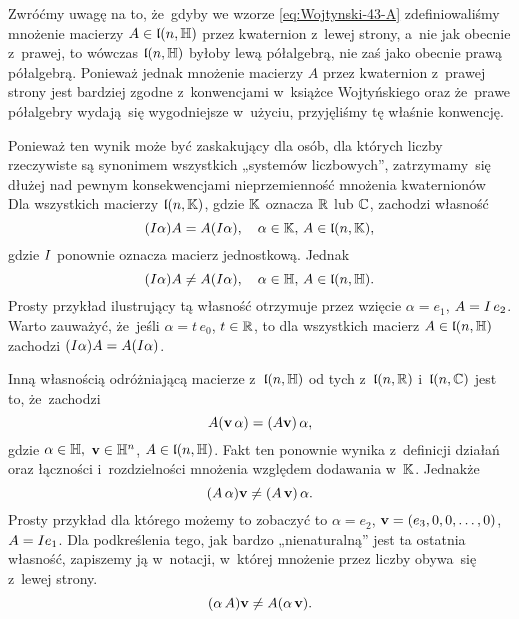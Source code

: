 \documentclass[a4paper,11pt]{article}
\begin{document}
Zwróćmy uwagę na to, że~gdyby we wzorze \eqref{eq:Wojtynski-43-A}
zdefiniowaliśmy mnożenie macierzy $A \in \mathfrak{l}( n, \mathbb{H} )$ przez kwaternion
z~lewej strony, a~nie jak obecnie z~prawej, to wówczas $\mathfrak{l}( n, \mathbb{H} )$
byłoby lewą półalgebrą, nie zaś jako obecnie prawą półalgebrą. Ponieważ
jednak mnożenie macierzy $A$ przez kwaternion z~prawej strony jest bardziej
zgodne z~konwencjami w~książce Wojtyńskiego oraz że~prawe półalgebry
wydają~się wygodniejsze w~użyciu, przyjęliśmy tę właśnie konwencję.

Ponieważ ten wynik może być zaskakujący dla osób, dla których liczby
rzeczywiste są synonimem wszystkich „systemów liczbowych”, zatrzymamy~się
dłużej nad pewnym konsekwencjami nieprzemienność mnożenia kwaternionów Dla
wszystkich macierzy $\mathfrak{l}( n, \mathbb{K} )$, gdzie $\mathbb{K}$ oznacza $\mathbb{R}$ lub
$\mathbb{C}$, zachodzi własność
\begin{equation}
  \label{eq:Wojtynski-54}
  ( I \alpha ) A = A ( I \alpha ), \quad
  \alpha \in \mathbb{K}, \, A \in \mathfrak{l}( n, \mathbb{K} ),
\end{equation}
gdzie $I$ ponownie oznacza macierz jednostkową. Jednak
\begin{equation}
  \label{eq:Wojtynski-55}
  ( I \alpha ) A \neq A ( I \alpha ), \quad
  \alpha \in \mathbb{H}, \, A \in \mathfrak{l}( n, \mathbb{H} ).
\end{equation}
Prosty przykład ilustrujący tą własność otrzymuje przez wzięcie
$\alpha = e_{ 1 }$, $A = I \, e_{ 2 }$. Warto zauważyć, że~jeśli
$\alpha = t \, e_{ 0 }$, $t \in \mathbb{R}$, to dla wszystkich macierz
$A \in \mathfrak{l}( n, \mathbb{H} )$ zachodzi $( I \alpha ) A = A ( I \alpha )$.

Inną własnością odróżniającą macierze z~$\mathfrak{l}( n, \mathbb{H} )$ od tych
z~$\mathfrak{l}( n, \mathbb{R} )$ i~$\mathfrak{l}( n, \mathbb{C} )$ jest to,
że~zachodzi
\begin{equation}
  \label{eq:Wojtynski-56}
  A ( \mathbf{v} \, \alpha ) = ( A \mathbf{v} ) \, \alpha,
\end{equation}
gdzie $\alpha \in \mathbb{H},$ $\mathbf{v} \in \mathbb{H}^{ n }$, $A \in \mathfrak{l}( n, \mathbb{H} )$. Fakt
ten ponownie wynika z~definicji działań oraz łączności i~rozdzielności
mnożenia
względem dodawania w~$\mathbb{K}$. Jednakże
\begin{equation}
  \label{eq:Wojtynski-57}
  ( A \, \alpha ) \mathbf{v} \neq ( A \, \mathbf{v} ) \, \alpha.
\end{equation}
Prosty przykład dla którego możemy to zobaczyć to $\alpha = e_{ 2 }$,
$\mathbf{v} = ( e_{ 3 }, 0, 0, \ldots, 0 )$, $A = I e_{ 1 }$. Dla
podkreślenia tego,
jak bardzo „nienaturalną” jest ta ostatnia własność, zapiszemy ją
w~notacji, w~której mnożenie przez liczby obywa~się z~lewej strony.
\begin{equation}
  \label{eq:Wojtynski-58}
  ( \alpha \, A ) \mathbf{v} \neq A ( \alpha \, \mathbf{v} ).
\end{equation}
\end{document}

